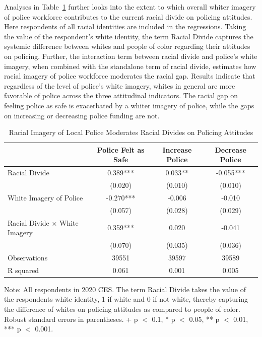\documentclass[
  12pt,
]{article}
\begin{document}
Analyses in Table~\ref{tbl-divides} further looks into the extent to
which overall whiter imagery of police workforce contributes to the
current racial divide on policing attitudes. Here respondents of all
racial identities are included in the regressions. Taking the value of
the respondent's white identity, the term Racial Divide captures the
systemic difference between whites and people of color regarding their
attitudes on policing. Further, the interaction term between racial
divide and police's white imagery, when combined with the standalone
term of racial divide, estimates how racial imagery of police workforce
moderates the racial gap. Results indicate that regardless of the level
of police's white imagery, whites in general are more favorable of
police across the three attitudinal indicators. The racial gap on
feeling police as safe is exacerbated by a whiter imagery of police,
while the gaps on increasing or decreasing police funding are not.

\hypertarget{tbl-divides}{}
\begin{table}
\caption{\label{tbl-divides}Racial Imagery of Local Police Moderates Racial Divides on Policing
Attitudes }\tabularnewline

\centering
\begin{threeparttable}
\begin{tabular}[t]{lccc}
\toprule
  & Police Felt as Safe & Increase Police & Decrease Police\\
\midrule
Racial Divide & 0.389*** & 0.033** & -0.055***\\
 & (0.020) & (0.010) & (0.010)\\
White Imagery of Police & -0.270*** & -0.006 & -0.010\\
 & (0.057) & (0.028) & (0.029)\\
Racial Divide × White Imagery & 0.359*** & 0.020 & -0.041\\
 & (0.070) & (0.035) & (0.036)\\
\midrule
Observations & 39551 & 39597 & 39589\\
R squared & 0.061 & 0.001 & 0.005\\
\bottomrule
\end{tabular}
\begin{tablenotes}
\item Note: All respondents in 2020 CES. The term Racial Divide takes the value of the respondents white identity, 1 if white and 0 if not white, thereby capturing the difference of whites on policing attitudes as compared to people of color. Robust standard errors in parentheses. + p $<$ 0.1, * p $<$ 0.05, ** p $<$ 0.01, *** p $<$ 0.001.
\end{tablenotes}
\end{threeparttable}
\end{table}
\end{document}
